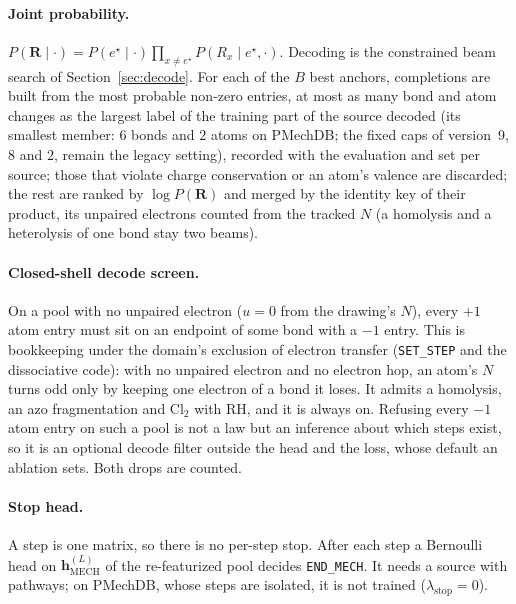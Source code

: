 \documentclass[11pt,a4paper]{article}
\newcommand{\vb}[1]{\bm{#1}}
\begin{document}
\paragraph{Joint probability.} $P(\vb{R}\mid\cdot)=P(e^\star\mid\cdot)\prod_{x\ne e^\star}P(R_x\mid e^\star,\cdot)$. Decoding is the constrained beam search of Section~\ref{sec:decode}. For each of the $B$ best anchors, completions are built from the most probable non-zero entries, at most as many bond and atom changes as the largest label of the training part of the source decoded (its smallest member: $6$ bonds and $2$ atoms on PMechDB; the fixed caps of version~9, $8$ and $2$, remain the legacy setting), recorded with the evaluation and set per source; those that violate charge conservation or an atom's valence are discarded; the rest are ranked by $\log P(\vb{R})$ and merged by the identity key of their product, its unpaired electrons counted from the tracked $N$ (a homolysis and a heterolysis of one bond stay two beams).

\paragraph{Closed-shell decode screen.} On a pool with no unpaired electron ($u=0$ from the drawing's $N$), every $+1$ atom entry must sit on an endpoint of some bond with a $-1$ entry. This is bookkeeping under the domain's exclusion of electron transfer (\texttt{SET\_STEP} and the dissociative code): with no unpaired electron and no electron hop, an atom's $N$ turns odd only by keeping one electron of a bond it loses. It admits a homolysis, an azo fragmentation and Cl$_2$ with RH, and it is always on. Refusing every $-1$ atom entry on such a pool is not a law but an inference about which steps exist, so it is an optional decode filter outside the head and the loss, whose default an ablation sets. Both drops are counted.

\paragraph{Stop head.} A step is one matrix, so there is no per-step stop. After each step a Bernoulli head on $\vb{h}^{(L)}_{\mathrm{MECH}}$ of the re-featurized pool decides \texttt{END\_MECH}. It needs a source with pathways; on PMechDB, whose steps are isolated, it is not trained ($\lambda_{\mathrm{stop}}=0$).
\end{document}
